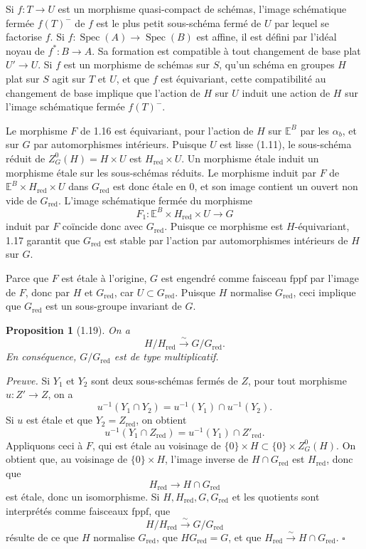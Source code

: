 \documentclass[10pt]{article}
\newcommand{\Spec}{\operatorname{Spec}}
\newcommand{\red}{\mathrm{red}}
\newcommand{\fppf}{\mathrm{fppf}}
\theoremstyle{deligne}
\newtheorem*{proposition*}{Proposition}
\newenvironment{proofdel}{\textit{Preuve.}}{\hfill$\square$}
\newcommand{\heading}[1]{\vspace{0.7em}\noindent{\bfseries #1}\quad}
\begin{document}
\heading{1.17.} Si \(f:T\to U\) est un morphisme quasi-compact de schémas, l'image schématique fermée \(f(T)^-\) de \(f\) est le plus petit sous-schéma fermé de \(U\) par lequel se factorise \(f\). Si \(f:\Spec(A)\to\Spec(B)\) est affine, il est défini par l'idéal noyau de \(f^*:B\to A\). Sa formation est compatible à tout changement de base plat \(U'\to U\). Si \(f\) est un morphisme de schémas sur \(S\), qu'un schéma en groupes \(H\) plat sur \(S\) agit sur \(T\) et \(U\), et que \(f\) est équivariant, cette compatibilité au changement de base implique que l'action de \(H\) sur \(U\) induit une action de \(H\) sur l'image schématique fermée \(f(T)^-\).

\heading{1.18. Preuve de l'invariance de \(G_{\red}\) dans \(G\).} Le morphisme \(F\) de 1.16 est équivariant, pour l'action de \(H\) sur \(\mathbb E^B\) par les \(\alpha_b\), et sur \(G\) par automorphismes intérieurs. Puisque \(U\) est lisse (1.11), le sous-schéma réduit de \(Z^0_G(H)=H\times U\) est \(H_{\red}\times U\). Un morphisme étale induit un morphisme étale sur les sous-schémas réduits. Le morphisme induit par \(F\) de \(\mathbb E^B\times H_{\red}\times U\) dans \(G_{\red}\) est donc étale en \(0\), et son image contient un ouvert non vide de \(G_{\red}\). L'image schématique fermée du morphisme
\[
  F_1:\mathbb E^B\times H_{\red}\times U\longrightarrow G
\]
induit par \(F\) coïncide donc avec \(G_{\red}\). Puisque ce morphisme est \(H\)-équivariant, 1.17 garantit que \(G_{\red}\) est stable par l'action par automorphismes intérieurs de \(H\) sur \(G\).

Parce que \(F\) est étale à l'origine, \(G\) est engendré comme faisceau \(\fppf\) par l'image de \(F\), donc par \(H\) et \(G_{\red}\), car \(U\subset G_{\red}\). Puisque \(H\) normalise \(G_{\red}\), ceci implique que \(G_{\red}\) est un sous-groupe invariant de \(G\).

\begin{proposition*}[1.19]
On a
\[
  H/H_{\red}\overset{\sim}{\longrightarrow}G/G_{\red}.
\]
En conséquence, \(G/G_{\red}\) est de type multiplicatif.
\end{proposition*}

\begin{proofdel}
Si \(Y_1\) et \(Y_2\) sont deux sous-schémas fermés de \(Z\), pour tout morphisme \(u:Z'\to Z\), on a
\[
u^{-1}(Y_1\cap Y_2)=u^{-1}(Y_1)\cap u^{-1}(Y_2).
\]
Si \(u\) est étale et que \(Y_2=Z_{\red}\), on obtient
\[
u^{-1}(Y_1\cap Z_{\red})=u^{-1}(Y_1)\cap Z'_{\red}.
\]
Appliquons ceci à \(F\), qui est étale au voisinage de \(\{0\}\times H\subset \{0\}\times Z^0_G(H)\). On obtient que, au voisinage de \(\{0\}\times H\), l'image inverse de \(H\cap G_{\red}\) est \(H_{\red}\), donc que
\[
H_{\red}\longrightarrow H\cap G_{\red}
\]
est étale, donc un isomorphisme. Si \(H,H_{\red},G,G_{\red}\) et les quotients sont interprétés comme faisceaux \(\fppf\), que
\[
H/H_{\red}\overset{\sim}{\longrightarrow}G/G_{\red}
\]
résulte de ce que \(H\) normalise \(G_{\red}\), que \(HG_{\red}=G\), et que \(H_{\red}\overset{\sim}{\longrightarrow}H\cap G_{\red}\).
\end{proofdel}
\end{document}
